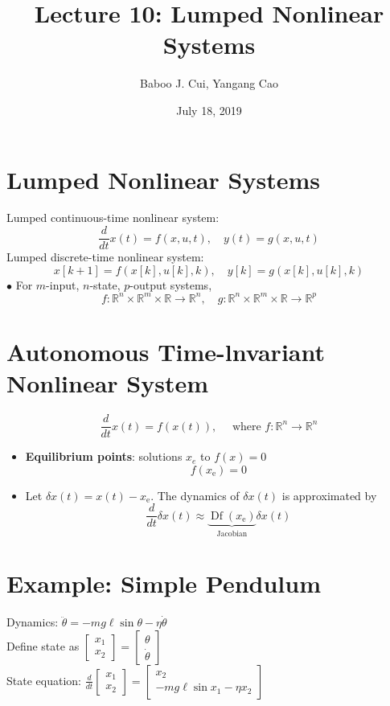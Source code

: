 \documentclass[10pt,a4paper,oneside]{article}
\date{July 18, 2019}
\author{Baboo J. Cui, Yangang Cao}
\title{Lecture 10: Lumped Nonlinear Systems}
\begin{document}
\maketitle
\tableofcontents
\newpage
\section{Lumped Nonlinear Systems}
Lumped continuous-time nonlinear system:
\[
\frac{d}{d t} x(t)=f(x, u, t), \quad y(t)=g(x, u, t)
\]
Lumped discrete-time nonlinear system:
\[
x[k+1]=f(x[k], u[k], k), \quad y[k]=g(x[k], u[k], k)
\]
$\bullet$ For $m$-input, $n$-state, $p$-output systems,
\[
f : \mathbb{R}^{n} \times \mathbb{R}^{m} \times \mathbb{R} \rightarrow \mathbb{R}^{n}, \quad g : \mathbb{R}^{n} \times \mathbb{R}^{m} \times \mathbb{R} \rightarrow \mathbb{R}^{p}
\]
\section{Autonomous Time-lnvariant Nonlinear System}
\[
\frac{d}{d t} x(t)=f(x(t)), \quad \text { where } f : \mathbb{R}^{n} \rightarrow \mathbb{R}^{n}
\]
\begin{itemize}
\item {\bfseries Equilibrium points}: solutions $x_{e}$ to $f(x)=0$
\[
f\left(x_{\mathrm{e}}\right)=0
\]
\item Let $\delta x(t)=x(t)-x_{\mathrm{e}} .$ The dynamics of $\delta x(t)$ is approximated by
\[
\frac{d}{d t} \delta x(t) \approx \underbrace{  \operatorname{Df}\left(x_{\mathrm{e}}\right)}_{\text { Jacobian }} \delta x(t)
\]
\end{itemize}
\section{Example: Simple Pendulum}
Dynamics: $\ddot{\theta}=-m g \ell \sin \theta-\eta \dot{\theta}$\\
Define state as $\left[\begin{array}{l}{x_{1}} \\ {x_{2}}\end{array}\right]=\left[\begin{array}{l}{\theta} \\ {\dot{\theta}}\end{array}\right]$\\
State equation:
$\frac{d}{d t}\left[\begin{array}{l}{x_{1}} \\ {x_{2}}\end{array}\right]=\left[\begin{array}{c}{x_{2}} \\ {-m g \ell \sin x_{1}-\eta x_{2}}\end{array}\right]$
\end{document}
